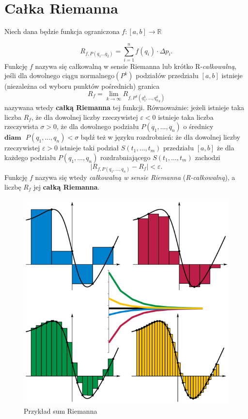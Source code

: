 \documentclass[a4paper,11pt]{article}
\begin{document}
\section*{Całka Riemanna}
Niech dana będzie funkcja ograniczona $f\colon[{a,b}]\rightarrow\mathbb{R}$

\begin{equation*}
R_{f,P(q_{1}\dots q_{2})}=\sum_{i=1}^{n}f(q_{i})\cdot\Delta p_{i} \text{.}
\end{equation*}
Funkcję $f$  nazywa się całkowalną w sensie Riemanna lub krótko R-\textit{całkowalną}, jeśli dla dowolnego ciągu normalnego$(P^{k})$  podziałów przedziału $[a,b]$  istnieje (niezależna od wyboru punktów pośrednich) granica
\begin{equation*}
R_{f}=\lim_{k \to \infty}R_{f,P^{k}({q^{k}_{1},\dots,q^{k}_{n}}_{k})}
\end{equation*}
nazywana wtedy \textbf{całką Riemanna} tej funkcji. Równoważnie: jeżeli istnieje taka liczba $R_{f}$, że dla dowolnej liczby rzeczywistej $\varepsilon<0$ istnieje taka liczba rzeczywista $\sigma>0$, że dla dowolnego podziału $P(q_{1},\dots,q_{n})$ o średnicy $\scriptstyle\mathbf{diam}\text{ } P(q_{1},\dots,q_{n})<\sigma$ bądź też w języku rozdrobnień: że dla dowolnej liczby rzeczywistej $\varepsilon>0$ istnieje taki podział $S(t_{1},\dots,t_{m})$ przedziału $[a,b]$ że dla każdego podziału $P(q_{1},\dots,q_{n})$ rozdrabniającego $S(t_{1},\dots,t_{m})$ zachodzi
\begin{equation*}
\vert R_{f,P(q_{1},\dots,q_{n})} - R_{f}\vert < \varepsilon\text{.}
\end{equation*}
Funkcję $f$ nazywa się wtedy \textit{całkowalną w sensie Riemanna} (\textit{R-całkowalną}), a liczbę $R_{f}$ jej \textbf{całką Riemanna}.
\begin{figure}[ht]
\centerline{\includegraphics[scale=2]{suma_calek}}
\caption{Przykład sum Riemanna}
\end{figure}
\end{document}

